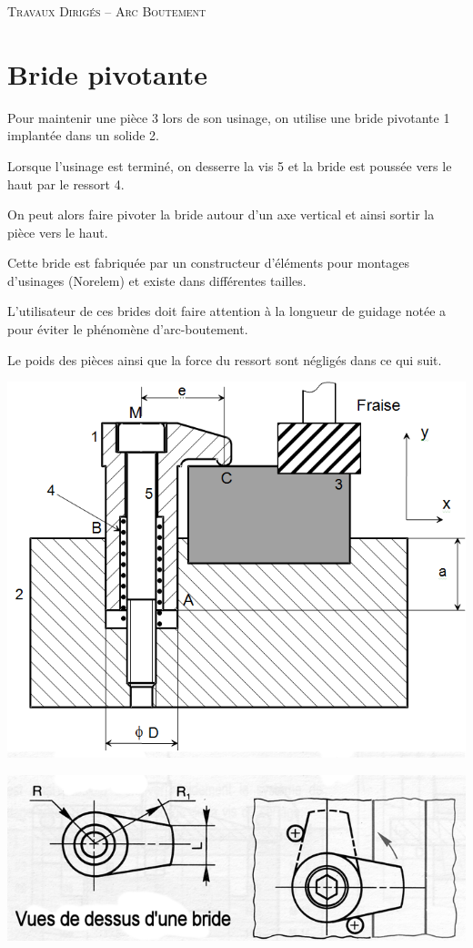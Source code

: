 \documentclass[10pt]{article}
\begin{document}

\begin{center}
\Large{\textsc{Travaux Dirigés -- Arc Boutement}}
\end{center}



\section*{Bride pivotante}
Pour maintenir une pièce 3 lors de son usinage, on utilise une bride pivotante 1 implantée dans un solide 2. 

Lorsque l’usinage est terminé, on desserre la vis 5 et la bride est poussée vers le haut par le ressort 4. 

On peut alors faire pivoter la bride autour d’un axe vertical et ainsi sortir la pièce vers le haut.

Cette bride est fabriquée par un constructeur d’éléments pour montages d’usinages (Norelem) et existe dans différentes tailles.

L’utilisateur de ces brides doit faire attention à la longueur de guidage notée a pour éviter le phénomène d’arc-boutement.

Le poids des pièces ainsi que la force du ressort sont négligés dans ce qui suit.

\begin{center}
\includegraphics[width=.7\textwidth]{images/im_01.png}
\end{center}

\begin{center}
\includegraphics[width=.45\textwidth]{images/im_02.png}
\end{center}
\end{document}

